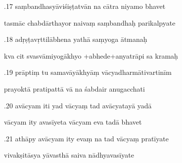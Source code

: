\documentclass[article,12pt,a4paper]{memoir}%
\newcounter{parCount}
\begin{document}
	  
	  \pstart {}.17 saṃbandhasyāviśiṣṭatvān na cātra niyamo bhavet 
	{}
	\pend%
      

	  
	  \pstart \leavevmode%
	tasmāc chabdārthayor naivaṃ saṃbandhaḥ parikalpyate 
	{}
	\pend%
      

	  
	  \pstart {}.18 adṛṣṭavṛttilābhena yathā saṃyoga ātmanaḥ 
	{}
	\pend%
      

	  
	  \pstart \leavevmode%
	kva cit svasvāmiyogākhyo +abhede+anyatrāpi sa kramaḥ 
	{}
	\pend%
      

	  
	  \pstart {}.19 prāptiṃ tu samavāyākhyāṃ   vācyadharmātivartinīm 
	{}
	\pend%
      

	  
	  \pstart \leavevmode%
	prayoktā pratipattā vā na śabdair anugacchati 
	{}
	\pend%
      

	  
	  \pstart {}.20 avācyam iti yad vācyaṃ tad avācyatayā yadā 
	{}
	\pend%
      

	  
	  \pstart \leavevmode%
	vācyam ity avasīyeta vācyam eva tadā bhavet 
	{}
	\pend%
      

	  
	  \pstart {}.21 athāpy avācyam ity evaṃ na tad vācyaṃ pratīyate 
	{}
	\pend%
      

	  
	  \pstart \leavevmode%
	vivakṣitāsya yāvasthā saiva nādhyavasīyate 
	{}
	\pend%
      
\end{document}
